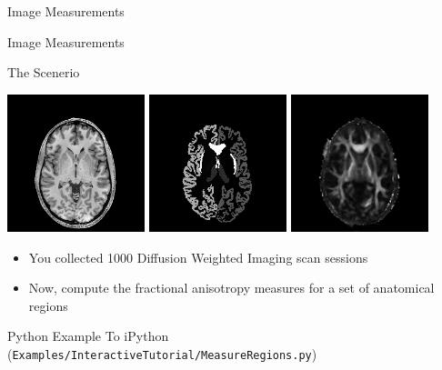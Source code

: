 \begin{frame}{Image Measurements}
\fontsize{36pt}{36pt}\selectfont
\center
\begin{center}
Image Measurements
\end{center}
\end{frame}

\begin{frame}{The Scenerio}
\begin{center}
  \includegraphics[width=0.3\textwidth]{Images/T1}
  \includegraphics[width=0.3\textwidth]{Images/LB}
  \includegraphics[width=0.3\textwidth]{Images/FA}
\end{center}

\begin{itemize}
  \item You collected 1000 Diffusion Weighted Imaging scan sessions
  \item Now, compute the fractional anisotropy measures for a set of anatomical regions
\end{itemize}
\end{frame}

\begin{frame}{Python Example}
To iPython (\texttt{Examples/InteractiveTutorial/MeasureRegions.py})
\end{frame}

